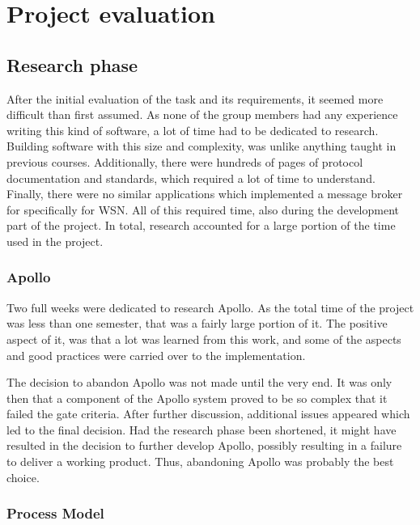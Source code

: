 
\chapter{Project evaluation}
\label{ch:project_evaluation}

\section{Research phase}
\label{sec:project_evaluation-research_phase}


After the initial evaluation of the task and its requirements, it seemed more difficult than first assumed. As none of the group members had any experience writing this kind of software, a lot of time had to be dedicated to research. Building software with this size and complexity, was unlike anything taught in previous courses. Additionally, there were hundreds of pages of protocol documentation and standards, which required a lot of time to understand. Finally, there were no similar applications which implemented a message broker for specifically for WSN. All of this required time, also during the development part of the project. In total, research accounted for a large portion of the time used in the project.

\subsection{Apollo}
\label{subsec:project_evaluation-research_phase-apollo}

Two full weeks were dedicated to research Apollo. As the total time of the project was less than one semester, that was a fairly large portion of it. The positive aspect of it, was that a lot was learned from this work, and some of the aspects and good practices were carried over to the implementation.

The decision to abandon Apollo was not made until the very end. It was only then that a component of the Apollo system proved to be so complex that it failed the gate criteria. After further discussion, additional issues appeared which led to the final decision. Had the research phase been shortened, it might have resulted in the decision to further develop Apollo, possibly resulting in a failure to deliver a working product. Thus, abandoning Apollo was probably the best choice.

\subsection{Process Model}
\label{subsec:project_evaluation-research_phase-process_model}

